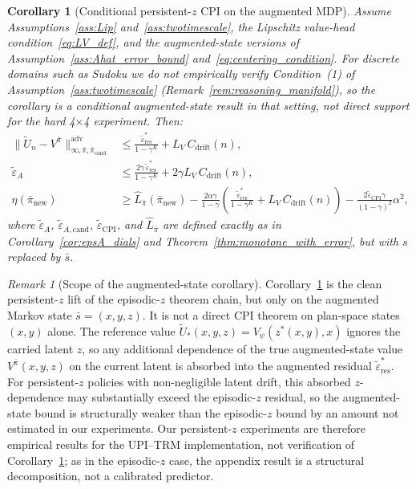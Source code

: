 \documentclass{article}
\theoremstyle{plain}
\newtheorem{corollary}[theorem]{Corollary}
\theoremstyle{definition}
\theoremstyle{remark}
\newtheorem{remark}[theorem]{Remark}
\newcommand{\Cdrift}{C_{\mathrm{drift}}}
\begin{document}
\begin{corollary}[Conditional persistent-$z$ CPI on the augmented MDP]
\label{cor:persistent_cpi_augmented}
Assume Assumptions~\ref{ass:Lip} and~\ref{ass:twotimescale}, the Lipschitz value-head condition~\eqref{eq:LV_def}, and the augmented-state versions of Assumption~\ref{ass:Ahat_error_bound} and~\eqref{eq:centering_condition}.
For discrete domains such as Sudoku we do not empirically verify Condition~(1) of Assumption~\ref{ass:twotimescale} (Remark~\ref{rem:reasoning_manifold}), so the corollary is a conditional augmented-state result in that setting, not direct support for the hard 4$\times$4 experiment.
Then:
\begin{align}
\|\widetilde U_n - V^{\bar \pi}\|_{\infty,\bar\pi,\bar\pi_{\mathrm{cand}}}^{\mathrm{adv}}
&\le
\frac{\widetilde \varepsilon_{\mathrm{res}}^*}{1-\gamma^K}
+
L_V\,\Cdrift(n),
\label{eq:persistent_augmented_value}
\\
\widetilde \varepsilon_A
&\le
\frac{2\gamma\,\widetilde \varepsilon_{\mathrm{res}}^*}{1-\gamma^K}
+
2\gamma L_V\,\Cdrift(n),
\label{eq:persistent_augmented_adv}
\\
\eta(\bar\pi_{\mathrm{new}})
&\ge
\widehat L_{\bar\pi}(\bar\pi_{\mathrm{new}})
-
\frac{2\alpha\gamma}{1-\gamma}
\left(
\frac{\widetilde \varepsilon_{\mathrm{res}}^*}{1-\gamma^K}
+
L_V\,\Cdrift(n)
\right)
-
\frac{2\widetilde \varepsilon_{\mathrm{CPI}}\gamma}{(1-\gamma)^2}\alpha^2,
\label{eq:persistent_augmented_cpi}
\end{align}
where $\widetilde \varepsilon_A$, $\widetilde \varepsilon_{A,\mathrm{cand}}$, $\widetilde \varepsilon_{\mathrm{CPI}}$, and $\widehat L_{\bar\pi}$ are defined exactly as in Corollary~\ref{cor:epsA_dials} and Theorem~\ref{thm:monotone_with_error}, but with $s$ replaced by $\bar s$.
\end{corollary}

\begin{remark}[Scope of the augmented-state corollary]
\label{rem:persistent_augmented_scope}
Corollary~\ref{cor:persistent_cpi_augmented} is the clean persistent-$z$ lift of the episodic-$z$ theorem chain, but only on the augmented Markov state $\bar s=(x,y,z)$.
It is not a direct CPI theorem on plan-space states $(x,y)$ alone.
The reference value $\widetilde U_*(x,y,z)=V_\psi(z^*(x,y),x)$ ignores the carried latent $z$, so any additional dependence of the true augmented-state value $V^{\bar\pi}(x,y,z)$ on the current latent is absorbed into the augmented residual $\widetilde \varepsilon_{\mathrm{res}}^*$.
For persistent-$z$ policies with non-negligible latent drift, this absorbed $z$-dependence may substantially exceed the episodic-$z$ residual, so the augmented-state bound is structurally weaker than the episodic-$z$ bound by an amount not estimated in our experiments.
Our persistent-$z$ experiments are therefore empirical results for the UPI--TRM implementation, not verification of Corollary~\ref{cor:persistent_cpi_augmented}; as in the episodic-$z$ case, the appendix result is a structural decomposition, not a calibrated predictor.
\end{remark}
\end{document}
